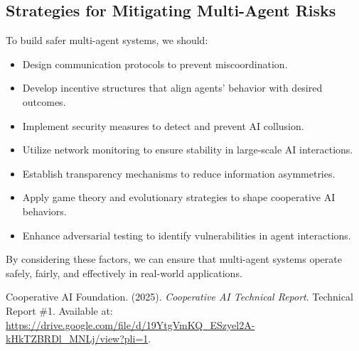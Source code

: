 \documentclass{article}
\begin{document}
\subsection{Strategies for Mitigating Multi-Agent Risks}
To build safer multi-agent systems, we should:
\begin{itemize}
    \item Design communication protocols to prevent miscoordination.
    \item Develop incentive structures that align agents' behavior with desired outcomes.
    \item Implement security measures to detect and prevent AI collusion.
    \item Utilize network monitoring to ensure stability in large-scale AI interactions.
    \item Establish transparency mechanisms to reduce information asymmetries.
    \item Apply game theory and evolutionary strategies to shape cooperative AI behaviors.
    \item Enhance adversarial testing to identify vulnerabilities in agent interactions.
\end{itemize}

By considering these factors, we can ensure that multi-agent systems operate safely, fairly, and effectively in real-world applications.


\begin{thebibliography}{9}

 Cooperative AI Foundation. (2025). \textit{Cooperative AI Technical Report}. Technical Report \#1. Available at: \url{https://drive.google.com/file/d/19YtgVmKQ_ESzyel2A-kHkTZBRDl_MNLj/view?pli=1}.

\end{thebibliography}
\end{document}
